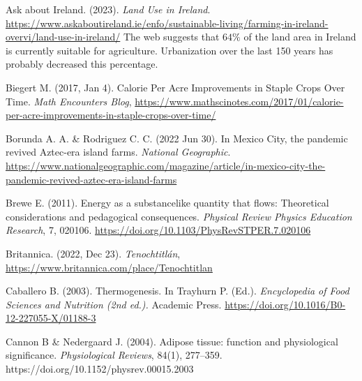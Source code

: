 \documentclass[11pt,letter]{article}
\begin{document}
\begin{thebibliography}{99}

Ask about Ireland.
(2023).
\textit{Land Use in Ireland}.
\url{https://www.askaboutireland.ie/enfo/sustainable-living/farming-in-ireland-overvi/land-use-in-ireland/}
The web suggests that $64\%$ of the land area in Ireland is currently suitable for agriculture.  Urbanization over the last 150 years has probably decreased this percentage.  


Biegert M.
(2017, Jan 4).
Calorie Per Acre Improvements in Staple Crops Over Time.
\textit{Math Encounters Blog},
\url{https://www.mathscinotes.com/2017/01/calorie-per-acre-improvements-in-staple-crops-over-time/}

Borunda A. A. \& Rodriguez C. C.
(2022 Jun 30).
In Mexico City, the pandemic revived Aztec-era island farms.
\textit{National Geographic}.
\url{https://www.nationalgeographic.com/magazine/article/in-mexico-city-the-pandemic-revived-aztec-era-island-farms}

Brewe E.
(2011).
Energy as a substancelike quantity that flows: Theoretical considerations
and pedagogical consequences.
\textit{Physical Review Physics Education Research},
7, 020106.
\url{https://doi.org/10.1103/PhysRevSTPER.7.020106}

Britannica.
(2022, Dec 23).
\textit{Tenochtitlán},
\url{https://www.britannica.com/place/Tenochtitlan}

Caballero B. 
(2003). 
Thermogenesis.
In Trayhurn P. (Ed.). 
\textit{Encyclopedia of Food Sciences and Nutrition (2nd ed.).}
Academic Press.
\url{https://doi.org/10.1016/B0-12-227055-X/01188-3}

Cannon B \& Nedergaard J. 
(2004).
Adipose tissue: function and physiological significance.
\textit{Physiological Reviews}, 
84(1), 
277--359.
https://doi.org/10.1152/physrev.00015.2003


\end{thebibliography}
\end{document}
